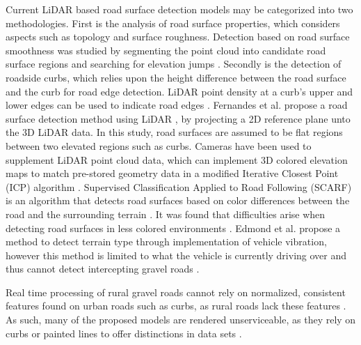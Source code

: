 \documentclass[journal,onecolumn]{IEEEtran}
\begin{document}
	{Current LiDAR based road surface detection models may be categorized into two methodologies. First is the analysis of road surface properties, which considers aspects such as topology and surface roughness. Detection based on road surface smoothness was studied by segmenting the point cloud into candidate road surface regions and searching for elevation jumps \cite{liu_new_2013}. Secondly is the detection of roadside curbs, which relies upon the height difference between the road surface and the curb for road edge detection. LiDAR point density at a curb's upper and lower edges can be used to indicate road edges \cite{ibrahim_curb-based_2012}. Fernandes et al. propose a road surface detection method using LiDAR \cite{fernandes_road_2014}, by projecting a 2D reference plane unto the 3D LiDAR data. In this study, road surfaces are assumed to be flat regions between two elevated regions such as curbs. Cameras have been used to supplement LiDAR point cloud data, which can implement 3D colored elevation maps to match pre-stored geometry data in a modified Iterative Closest Point (ICP) algorithm \cite{manz_detection_2011}. Supervised Classification Applied to Road Following (SCARF) is an algorithm that detects road surfaces based on color differences between the road and the surrounding terrain \cite{crisman_scarf_1993}. It was found that difficulties arise when detecting road surfaces in less colored environments \cite{crisman_scarf_1993,manz_detection_2011}. Edmond et al. propose a method to detect terrain type through implementation of vehicle vibration, however this method is limited to what the vehicle is currently driving over and thus cannot detect intercepting gravel roads \cite{dupont_online_2008}.}
	
	{Real time processing of rural gravel roads cannot rely on normalized, consistent features found on urban roads such as curbs, as rural roads lack these features \cite{skorseth_gravel_nodate}. As such, many of the proposed models are rendered unserviceable, as they rely on curbs or painted lines to offer distinctions in data sets \cite{yadav_extraction_2017,liu_new_2013,qiu_fast_2016,fernandes_road_2014,seker_experiments_nodate,yang_semi-automated_2013,miyazaki_line-based_2014,hervieu_road_2013,smadja_road_nodate}.}
	
\end{document}
